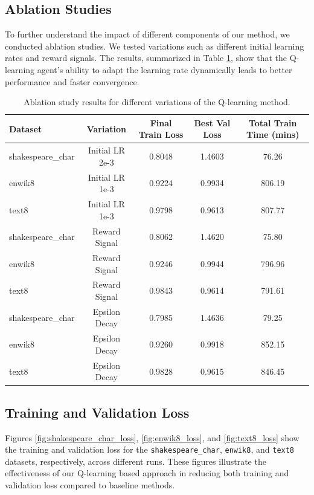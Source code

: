 \documentclass{article} %
\begin{document}
\subsection{Ablation Studies}

To further understand the impact of different components of our method, we conducted ablation studies. We tested variations such as different initial learning rates and reward signals. The results, summarized in Table \ref{tab:ablation_results}, show that the Q-learning agent's ability to adapt the learning rate dynamically leads to better performance and faster convergence.

\begin{table}[h]
    \centering
    \begin{tabular}{lcccc}
        \toprule
        Dataset & Variation & Final Train Loss & Best Val Loss & Total Train Time (mins) \\
        \midrule
        shakespeare\_char & Initial LR 2e-3 & 0.8048 & 1.4603 & 76.26 \\
        enwik8 & Initial LR 1e-3 & 0.9224 & 0.9934 & 806.19 \\
        text8 & Initial LR 1e-3 & 0.9798 & 0.9613 & 807.77 \\
        shakespeare\_char & Reward Signal & 0.8062 & 1.4620 & 75.80 \\
        enwik8 & Reward Signal & 0.9246 & 0.9944 & 796.96 \\
        text8 & Reward Signal & 0.9843 & 0.9614 & 791.61 \\
        shakespeare\_char & Epsilon Decay & 0.7985 & 1.4636 & 79.25 \\
        enwik8 & Epsilon Decay & 0.9260 & 0.9918 & 852.15 \\
        text8 & Epsilon Decay & 0.9828 & 0.9615 & 846.45 \\
        \bottomrule
    \end{tabular}
    \caption{Ablation study results for different variations of the Q-learning method.}
    \label{tab:ablation_results}
\end{table}

\subsection{Training and Validation Loss}

Figures \ref{fig:shakespeare_char_loss}, \ref{fig:enwik8_loss}, and \ref{fig:text8_loss} show the training and validation loss for the \texttt{shakespeare\_char}, \texttt{enwik8}, and \texttt{text8} datasets, respectively, across different runs. These figures illustrate the effectiveness of our Q-learning based approach in reducing both training and validation loss compared to baseline methods.
\end{document}
